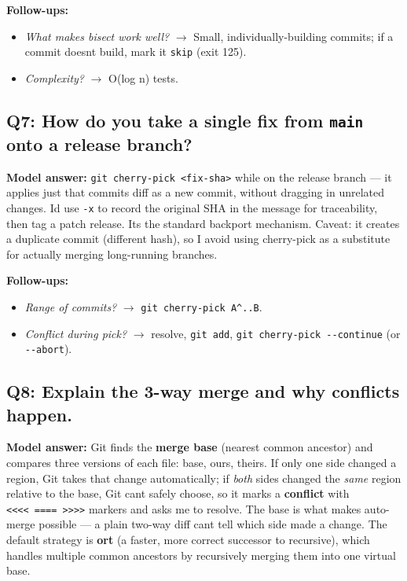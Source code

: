 \documentclass[11pt]{article}
\providecommand{\tightlist}{\setlength{\itemsep}{1pt}\setlength{\parskip}{0pt}}
\begin{document}
\textbf{Follow-ups:}

\begin{itemize}
\tightlist
\item
  \emph{What makes bisect work well?} \(\rightarrow\) Small, individually-building commits; if a commit doesn\textquotesingle t build, mark it \texttt{skip} (exit 125).
\item
  \emph{Complexity?} \(\rightarrow\) O(log n) tests.
\end{itemize}

\subsection{\texorpdfstring{Q7: How do you take a single fix from \texttt{main} onto a release branch?}{Q7: How do you take a single fix from main onto a release branch?}}\label{q7-how-do-you-take-a-single-fix-from-main-onto-a-release-branch}

\textbf{Model answer:} \texttt{git\ cherry-pick\ \textless{}fix-sha\textgreater{}} while on the release branch --- it applies just that commit\textquotesingle s diff as a new commit, without dragging in unrelated changes. I\textquotesingle d use \texttt{-x} to record the original SHA in the message for traceability, then tag a patch release. It\textquotesingle s the standard backport mechanism. Caveat: it creates a duplicate commit (different hash), so I avoid using cherry-pick as a substitute for actually merging long-running branches.

\textbf{Follow-ups:}

\begin{itemize}
\tightlist
\item
  \emph{Range of commits?} \(\rightarrow\) \texttt{git\ cherry-pick\ A\^{}..B}.
\item
  \emph{Conflict during pick?} \(\rightarrow\) resolve, \texttt{git\ add}, \texttt{git\ cherry-pick\ -\/-continue} (or \texttt{-\/-abort}).
\end{itemize}

\subsection{Q8: Explain the 3-way merge and why conflicts happen.}\label{q8-explain-the-3-way-merge-and-why-conflicts-happen}

\textbf{Model answer:} Git finds the \textbf{merge base} (nearest common ancestor) and compares three versions of each file: base, ours, theirs. If only one side changed a region, Git takes that change automatically; if \emph{both} sides changed the \emph{same} region relative to the base, Git can\textquotesingle t safely choose, so it marks a \textbf{conflict} with \texttt{\textless{}\textless{}\textless{}\textless{}\ ====\ \textgreater{}\textgreater{}\textgreater{}\textgreater{}} markers and asks me to resolve. The base is what makes auto-merge possible --- a plain two-way diff can\textquotesingle t tell which side made a change. The default strategy is \textbf{ort} (a faster, more correct successor to recursive), which handles multiple common ancestors by recursively merging them into one virtual base.
\end{document}
